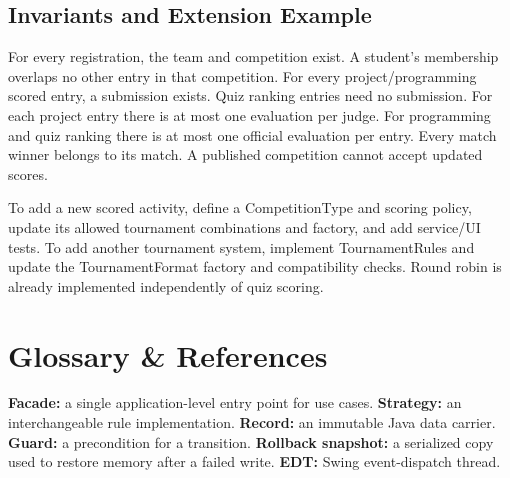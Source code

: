 \documentclass[12pt]{article}
\begin{document}
\subsection*{Invariants and Extension Example}
For every registration, the team and competition exist. A student's membership overlaps no other entry in that competition. For every project/programming scored entry, a submission exists. Quiz ranking entries need no submission. For each project entry there is at most one evaluation per judge. For programming and quiz ranking there is at most one official evaluation per entry. Every match winner belongs to its match. A published competition cannot accept updated scores.

To add a new scored activity, define a CompetitionType and scoring policy, update its allowed tournament combinations and factory, and add service/UI tests. To add another tournament system, implement TournamentRules and update the TournamentFormat factory and compatibility checks. Round robin is already implemented independently of quiz scoring.

\clearpage\section{Glossary \& References}
\textbf{Facade:} a single application-level entry point for use cases. \textbf{Strategy:} an interchangeable rule implementation. \textbf{Record:} an immutable Java data carrier. \textbf{Guard:} a precondition for a transition. \textbf{Rollback snapshot:} a serialized copy used to restore memory after a failed write. \textbf{EDT:} Swing event-dispatch thread.

\end{document}
